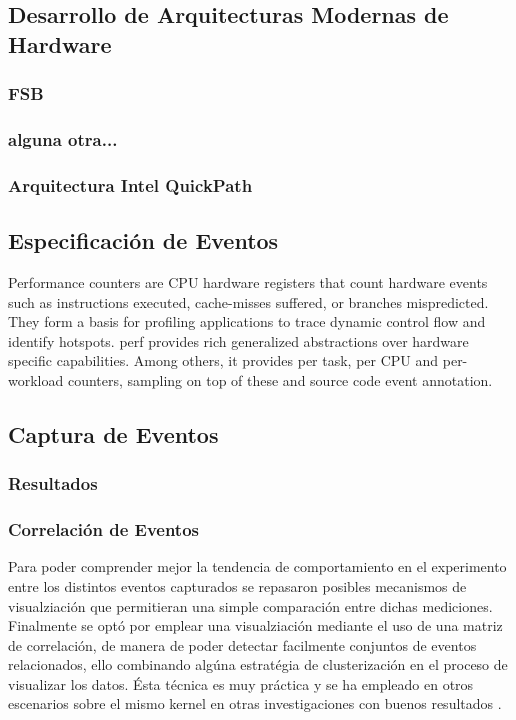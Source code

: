 \subsection{Desarrollo de Arquitecturas Modernas de Hardware}
\subsubsection{FSB}
\subsubsection{alguna otra...}
\subsubsection{Arquitectura Intel QuickPath}

\subsection{Especificación de Eventos}
Performance counters are CPU hardware registers that count hardware events such as instructions executed, cache-misses suffered, or branches mispredicted. They form a basis for profiling applications to trace dynamic control flow and identify hotspots. perf provides rich generalized abstractions over hardware specific capabilities. Among others, it provides per task, per CPU and per-workload counters, sampling on top of these and source code event annotation.

\subsection{Captura de Eventos}
\subsubsection{Resultados}
\subsubsection{Correlación de Eventos}
Para poder comprender mejor la tendencia de comportamiento en el experimento entre los distintos eventos capturados se repasaron posibles mecanismos de visualziación que permitieran una simple comparación entre dichas mediciones. Finalmente se optó por emplear una visualziación mediante el uso de una matriz de correlación, de manera de poder detectar facilmente conjuntos de eventos relacionados, ello combinando algúna estratégia de clusterización en el proceso de visualizar los datos. Ésta técnica es muy práctica y se ha empleado en otros escenarios sobre el mismo kernel en otras investigaciones con buenos resultados \cite{paper:clusteringKernel}.

